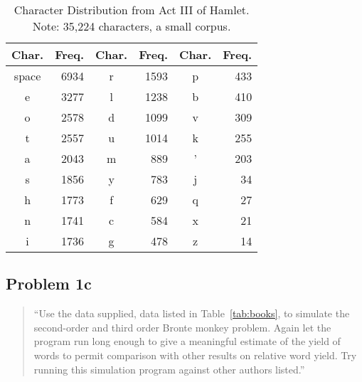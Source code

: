 \documentclass[conference]{IEEEtran}
\begin{document}
\begin{table}
\caption{\hspace{2em}Character Distribution from Act III of Hamlet. \newline
Note: 35,224 characters, a small corpus.\label{tab:hamlet}}
\vspace{-10pt}
\begin{center}
\begin{tabular}{crcrcr}
\hline
Char. & Freq. & Char. & Freq. & Char. & Freq. \\
\hline
space & 6934  & r     & 1593  & p     & 433   \\
e     & 3277  & l     & 1238  & b     & 410   \\
o     & 2578  & d     & 1099  & v     & 309   \\
t     & 2557  & u     & 1014  & k     & 255   \\
a     & 2043  & m     & 889   & '     & 203   \\
s     & 1856  & y     & 783   & j     & 34    \\
h     & 1773  & f     & 629   & q     & 27    \\
n     & 1741  & c     & 584   & x     & 21    \\
i     & 1736  & g     & 478   & z     & 14    \\
\hline
\end{tabular}
\end{center}
\end{table}


\subsection{Problem 1c}

\begin{quote}
``Use the data supplied, data listed in Table~\ref{tab:books}, to simulate the 
second-order and third order Bronte monkey problem. Again let the program run 
long enough to give a meaningful estimate of the yield of words to permit 
comparison with other results on relative word yield. Try running this 
simulation program against other authors listed.''
\end{quote}
\end{document}
